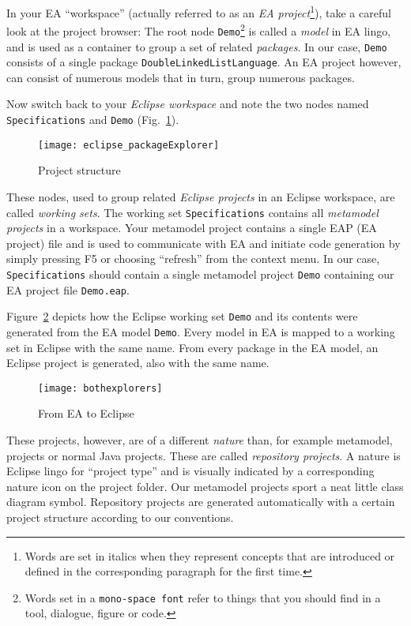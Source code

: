 In your EA ``workspace'' (actually referred to as an \emph{EA project}\footnote{Words are set in italics when they represent concepts that are introduced or
defined  in the corresponding paragraph for the first time.}), take a careful  look at the project browser:  The root node \texttt{Demo}\footnote{Words set  in
a \texttt{mono-space font} refer to things that you should find in a tool,  dialogue, figure or code.} is called a \emph{model} in EA lingo, and is used as a
container to group a set of related \emph{packages}. In our case, \texttt{Demo}  consists of a single package \texttt{DoubleLinkedListLanguage}. An EA project
however, can consist of numerous models that in turn, group numerous packages.

Now switch back to your \emph{Eclipse workspace} and note the two nodes named \texttt{Spe\-ci\-fi\-ca\-tions} and \texttt{Demo} (Fig.~\ref{fig_eclipsePS}).

\begin{figure}[htbp]
    \centering
    \texttt{[image: eclipse\_packageExplorer]}
    \caption{Project structure}
    \label{fig_eclipsePS}
 \end{figure}

These nodes, used to group related \emph{Eclipse projects} in an Eclipse workspace, are called \emph{working sets}. The working set
\texttt{Spe\-ci\-fi\-ca\-tions} contains all \emph{metamodel projects} in a  workspace. Your metamodel project contains a single EAP (EA project) file and is
used to communicate with EA and initiate code generation by simply pressing F5 or choosing ``refresh'' from the context menu.
In our case, \texttt{Specifications} should contain a single metamodel project \texttt{Demo} containing our EA project file  \texttt{Demo.eap}.
 
Figure~\ref{fig_fromEAtoEclipse} depicts how the Eclipse working set \texttt{Demo} and its contents were generated from the EA model \texttt{Demo}. Every model
in EA is mapped to a working set in Eclipse with the same name. From every package in the EA model, an Eclipse project is generated, also with the same name.

\begin{figure}[htbp]
    \centering
  \texttt{[image: bothexplorers]}
    \caption{From EA to Eclipse}
    \label{fig_fromEAtoEclipse}
\end{figure}

These projects, however, are of a different \emph{nature} than, for example metamodel, projects or normal Java projects. These are called \emph{repository
projects}. A nature is Eclipse lingo for ``project type'' and is visually indicated by a corresponding nature icon on the project folder.
Our metamodel projects sport a neat little class diagram symbol. Repository projects are generated automatically with a certain project structure according to
our conventions.


